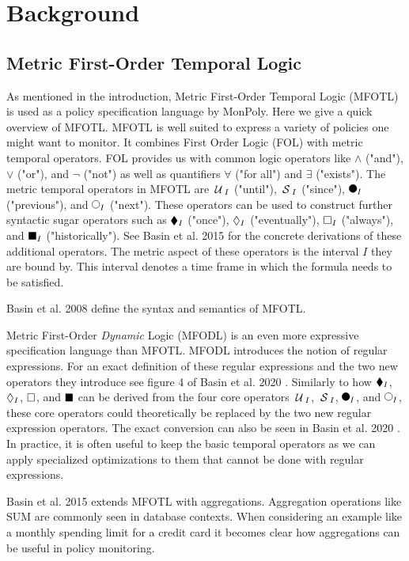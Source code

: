 \chapter{Background}

\section{Metric First-Order Temporal Logic}
As mentioned in the introduction, Metric First-Order Temporal Logic (MFOTL) \cite{Basin2008, Basin2015, Chomicki1995} is used as a policy specification language by MonPoly.
Here we give a quick overview of MFOTL.
MFOTL is well suited to express a variety of policies one might want to monitor.
It combines First Order Logic (FOL) with metric temporal operators.
FOL provides us with common logic operators like $\land$ ("and"), $\lor$ ("or"), and $\neg$ ("not") as well as quantifiers $\forall$ ("for all") and $\exists$ ("exists").
The metric temporal operators in MFOTL are $\,\mathcal{U}\,_I$ ("until"), $\,\mathcal{S}\,_I$ ("since"), $\Previous_I$ ("previous"), and $\Next_I$ ("next").
These operators can be used to construct further syntactic sugar operators such as $\blacklozenge_I$ ("once"), $\lozenge_I$ ("eventually"), $\square_I$ ("always"), and $\blacksquare_I$ ("historically").
See Basin et al. 2015 \cite{Basin2015} for the concrete derivations of these additional operators.
The metric aspect of these operators is the interval $I$ they are bound by.
This interval denotes a time frame in which the formula needs to be satisfied.

Basin et al. 2008 \cite{Basin2008} define the syntax and semantics of MFOTL.


Metric First-Order \textit{Dynamic} Logic (MFODL) \cite{Basin2020} is an even more expressive specification language than MFOTL.
MFODL introduces the notion of regular expressions.
For an exact definition of these regular expressions and the two new operators they introduce see figure 4 of Basin et al. 2020 \cite{Basin2020}.
Similarly to how $\blacklozenge_I$, $\lozenge_I$, $\square$, and $\blacksquare$ can be derived from the four core operators $\,\mathcal{U}\,_I$, $\,\mathcal{S}\,_I$, $\Previous_I$, and $\Next_I$, these core operators could theoretically be replaced by the two new regular expression operators.
The exact conversion can also be seen in Basin et al. 2020 \cite{Basin2020}.
In practice, it is often useful to keep the basic temporal operators as we can apply specialized optimizations to them that cannot be done with regular expressions.

Basin et al. 2015 \cite{Basin2015aggregations} extends MFOTL with aggregations.
Aggregation operations like SUM are commonly seen in database contexts.
When considering an example like a monthly spending limit for a credit card it becomes clear how aggregations can be useful in policy monitoring.


